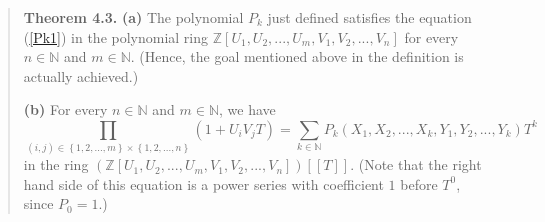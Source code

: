 \documentclass[numbers=enddot,12pt,final,onecolumn,notitlepage]{scrartcl}%
\begin{document}
\begin{quote}
\textbf{Theorem 4.3.} \textbf{(a)} The polynomial $P_{k}$ just defined
satisfies the equation (\ref{Pk1}) in the polynomial ring $\mathbb{Z}\left[
U_{1},U_{2},...,U_{m},V_{1},V_{2},...,V_{n}\right]  $ for every $n\in
\mathbb{N}$ and $m\in\mathbb{N}$. (Hence, the goal mentioned above in the
definition is actually achieved.)

\textbf{(b)} For every $n\in\mathbb{N}$ and $m\in\mathbb{N}$, we have%
\begin{equation}
\prod_{\left(  i,j\right)  \in\left\{  1,2,...,m\right\}  \times\left\{
1,2,...,n\right\}  }\left(  1+U_{i}V_{j}T\right)  =\sum_{k\in\mathbb{N}}%
P_{k}\left(  X_{1},X_{2},...,X_{k},Y_{1},Y_{2},...,Y_{k}\right)  T^{k}
\label{Pk2}%
\end{equation}
in the ring $\left(  \mathbb{Z}\left[  U_{1},U_{2},...,U_{m},V_{1}%
,V_{2},...,V_{n}\right]  \right)  \left[  \left[  T\right]  \right]  $. (Note
that the right hand side of this equation is a power series with coefficient
$1$ before $T^{0}$, since $P_{0}=1$.)
\end{quote}
\end{document}
